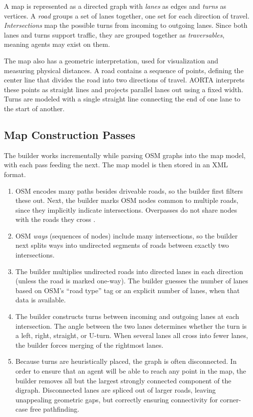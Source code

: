 \documentclass[letterpaper, 10 pt, conference]{ieeeconf}  %
\begin{document}
A map is represented as a directed graph with \emph{lanes} as edges and
\emph{turns} as vertices. A \emph{road} groups a set of lanes together, one set
for each direction of travel. \emph{Intersections} map the possible turns from
incoming to outgoing lanes.  Since both lanes and turns support traffic, they
are grouped together as \emph{traversables}, meaning agents may exist on them.

The map also has a geometric interpretation, used for visualization and
measuring physical distances. A road contains a sequence of points, defining
the center line that divides the road into two directions of travel. AORTA
interprets these points as straight lines and projects parallel lanes out using
a fixed width. Turns are modeled with a single straight line connecting the end
of one lane to the start of another. 

\subsection{Map Construction Passes}
\label{sec:mapconstruction}

The builder works incrementally while parsing OSM graphs into the map model,
with each pass feeding the next. The map model is then stored in an XML format.
\begin{enumerate}
  \item OSM encodes many paths besides driveable roads, so the builder first filters
        these out. Next, the builder marks OSM nodes common to multiple roads, since
        they implicitly indicate intersections. Overpasses do not share nodes
        with the roads they cross \cite{osmOverpass}.
  \item OSM \emph{ways} (sequences of nodes) include many
        intersections, so the builder next splits ways into undirected
        segments of roads between exactly two intersections.
  \item The builder multiplies undirected roads into directed lanes in each
        direction (unless the road is marked one-way). The builder guesses the
        number of lanes based on OSM's ``road type'' tag or an explicit number of
        lanes, when that data is available.
  \item The builder constructs turns between incoming and outgoing lanes at each
        intersection. The angle between the two lanes determines whether the turn is
        a left, right, straight, or U-turn. When several lanes all cross into fewer
        lanes, the builder forces merging of the rightmost lanes. 
  \item Because turns are heuristically placed, the graph is often disconnected.
        In order to ensure that an agent will be able to reach any point in the map,
        the builder removes all but the largest strongly connected component of the
        digraph. Disconnected lanes are spliced out of larger roads, leaving
        unappealing geometric gaps, but correctly ensuring connectivity for
        corner-case free pathfinding.
\end{enumerate}
\end{document}

